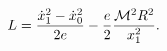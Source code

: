 \begin{equation}
L=\frac{\dot{x}_1^2-\dot{x}_0^2}{2e}
-\frac{e}{2}\frac{{\cal M}^2R^2}{x_1^2}.
\label{lagmasads}
\end{equation}

